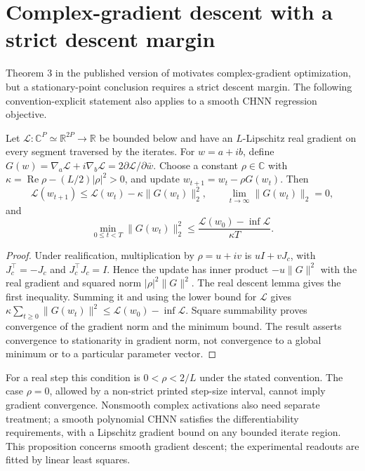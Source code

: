 \section{Complex-gradient descent with a strict descent margin}
\label{sec:complex-descent}

Theorem 3 in the published version of \citet{zhang} motivates complex-gradient optimization,
but a stationary-point conclusion requires a strict descent margin. The
following convention-explicit statement also applies to a smooth CHNN
regression objective.

\begin{proposition}
Let $\mathcal L:\mathbb C^P\simeq\mathbb R^{2P}\to\mathbb R$ be bounded
below and have an $L$-Lipschitz real gradient on every segment traversed by
the iterates. For $w=a+ib$, define
$G(w)=\nabla_a\mathcal L+i\nabla_b\mathcal L
=2\partial\mathcal L/\partial\bar w$.
Choose a constant $\rho\in\mathbb C$ with
$\kappa=\operatorname{Re}\rho-(L/2)|\rho|^2>0$, and update
$w_{t+1}=w_t-\rho G(w_t)$.
Then
\[
 \mathcal L(w_{t+1})\leq\mathcal L(w_t)-\kappa\|G(w_t)\|_2^2,
 \qquad \lim_{t\to\infty}\|G(w_t)\|_2=0,
\]
and
\[
 \min_{0\leq t<T}\|G(w_t)\|_2^2
 \leq\frac{\mathcal L(w_0)-\inf\mathcal L}{\kappa T}.
\]
\end{proposition}

\begin{proof}
Under realification, multiplication by $\rho=u+iv$ is $uI+vJ_c$, with
$J_c^\top=-J_c$ and $J_c^\top J_c=I$.
Hence the update has inner product $-u\|G\|^2$ with the real gradient
and squared norm $|\rho|^2\|G\|^2$.
The real descent lemma gives the first inequality. Summing it and using
the lower bound for $\mathcal L$ gives
$\kappa\sum_{t\geq0}\|G(w_t)\|^2\leq\mathcal L(w_0)-\inf\mathcal L$.
Square summability proves convergence of the gradient norm and the minimum
bound. The result asserts convergence to stationarity in gradient norm,
not convergence to a global minimum or to a particular parameter vector.
\end{proof}

For a real step this condition is $0<\rho<2/L$ under the stated convention.
The case $\rho=0$, allowed by a non-strict printed step-size interval,
cannot imply gradient convergence. Nonsmooth complex activations also need
separate treatment; a smooth polynomial CHNN satisfies the differentiability
requirements, with a Lipschitz gradient bound on any bounded iterate region.
This proposition concerns smooth gradient descent; the experimental
readouts are fitted by linear least squares.
